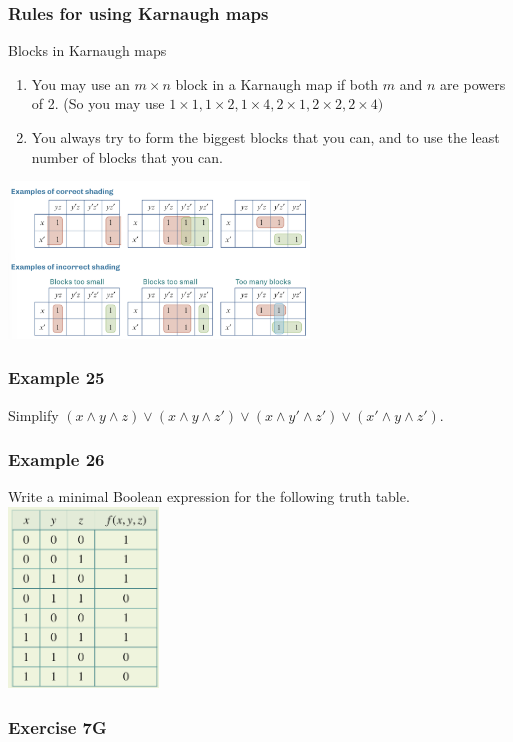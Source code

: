 \documentclass[
	11pt, %
]{beamer}
\begin{document}
\begin{frame}
    \frametitle{Rules for using Karnaugh maps}
    \begin{block}{Blocks in Karnaugh maps}
        \begin{enumerate}
            \item You may use an $m \times n$ block in a Karnaugh map if both $m$ and $n$ are powers of 2. (So you may use $1 \times 1, 1 \times 2, 1 \times 4, 2 \times 1, 2 \times 2, 2 \times 4)$
            \item You always try to form the biggest blocks that you can, and to use the least number of blocks that you can.
        \end{enumerate}
    \end{block}
    \begin{center}
        \includegraphics[width = 8cm]{Shading.png}
    \end{center}
\end{frame}

\begin{frame}[t]
    \frametitle{Example 25}
    Simplify $(x \land y \land z) \lor (x\land y \land z') \lor (x\land y' \land z')\lor (x' \land y \land z')$.
\end{frame}

\begin{frame}[t]
    \frametitle{Example 26}
    Write a minimal Boolean expression for the following truth table.\\
    \includegraphics[width = 4cm]{Ex26.png}
\end{frame}

\begin{frame}
    \frametitle{Exercise 7G}
\end{frame}
\end{document}
